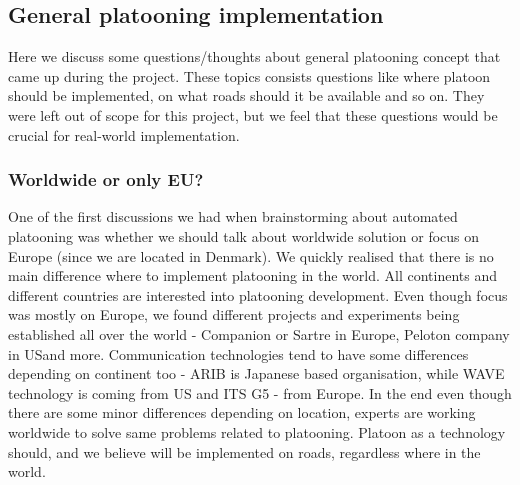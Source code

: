 \subsection{General platooning implementation}
Here we discuss some questions/thoughts about general platooning concept that came up during the project. These topics consists questions like where platoon should be implemented, on what roads should it be available and so on. They were left out of scope for this project, but we feel that these questions would be crucial for real-world implementation.
%
\subsubsection{Worldwide or only EU?}
%
One of the first discussions we had when brainstorming about automated platooning was whether we should talk about worldwide solution or focus on Europe (since we are located in Denmark). We quickly realised that there is no main difference where to implement platooning in the world. All continents and different countries are interested into platooning development. Even though focus was mostly on Europe, we found different projects and experiments being established all over the world - Companion\cite{2016CompanionProject} or Sartre\cite{Chan2012ProjectSARTRE} in Europe, Peloton company in US\footnotemark and more.
Communication technologies tend to have some differences depending on continent too - ARIB is Japanese based organisation, while WAVE technology is coming from US and ITS G5 - from Europe.
In the end even though there are some minor differences depending on location, experts are working worldwide to solve same problems related to platooning. Platoon as a technology should, and we believe will be implemented on roads, regardless where in the world.
%
